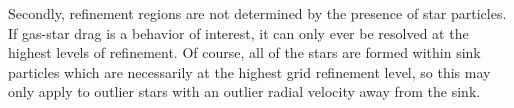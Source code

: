 \documentclass[10pt]{article}
\begin{document}
Secondly, refinement regions are not determined by the presence of star particles. If gas-star drag is a behavior of interest, it can only ever be resolved at the highest levels of refinement. Of course, all of the stars are formed within sink particles which are necessarily at the highest grid refinement level, so this may only apply to outlier stars with an outlier radial velocity away from the sink.
\end{document}
